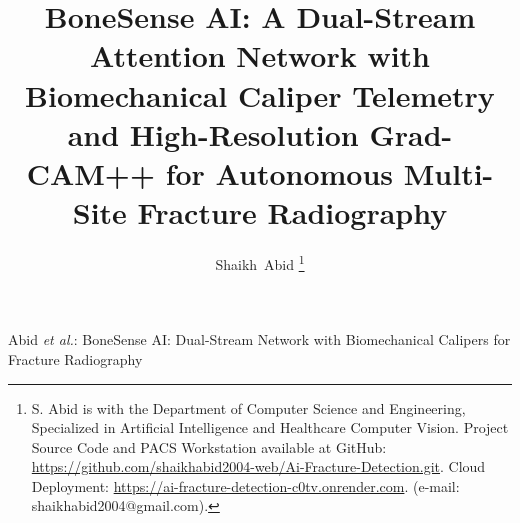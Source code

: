 \documentclass[journal]{IEEEtran}
\begin{document}
\title{BoneSense AI: A Dual-Stream Attention Network with Biomechanical Caliper Telemetry and High-Resolution Grad-CAM++ for Autonomous Multi-Site Fracture Radiography}

\author{Shaikh~Abid%
\thanks{S. Abid is with the Department of Computer Science and Engineering, Specialized in Artificial Intelligence and Healthcare Computer Vision. Project Source Code and PACS Workstation available at GitHub: \url{https://github.com/shaikhabid2004-web/Ai-Fracture-Detection.git}. Cloud Deployment: \url{https://ai-fracture-detection-c0tv.onrender.com}. (e-mail: shaikhabid2004@gmail.com).}}

%
{Abid \MakeLowercase{\textit{et al.}}: BoneSense AI: Dual-Stream Network with Biomechanical Calipers for Fracture Radiography}
\end{document}
